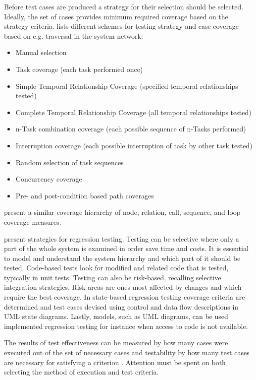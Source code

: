 \documentclass[12pt,a4paper,oneside,pdftex]{report}
\begin{document}
{Before test cases are produced a strategy for their selection should be selected. Ideally, the set of cases provides minimum required coverage based on the strategy criteria. \citet{benz2007combining} lists different schemes for testing strategy and case coverage based on e.g. traversal in the system network:
\begin{itemize}
\item Manual selection
\item Task coverage (each task performed once)
\item Simple Temporal Relationship Coverage (specified temporal relationships tested)
\item Complete Temporal Relationship Coverage (all temporal relationships tested)
\item n-Task combination coverage (each possible sequence of n-Tasks performed)
\item Interruption coverage (each possible interruption of task by other task tested)
\item Random selection of task sequences
\item Concurrency coverage
\item Pre- and post-condition based path coverages
\end{itemize}

\citet{linnenkugel1990test} present a similar coverage hierarchy of node, relation, call, sequence, and loop coverage measures. %

\citet{bhuyan2012survey} present strategies for regression testing. Testing can be selective where only a part of the whole system is examined in order save time and costs. It is essential to model and understand the system hierarchy and which part of it should be tested. Code-based tests look for modified and related code that is tested, typically in unit tests. Testing can also be risk-based, recalling selective integration strategies. Risk areas are ones most affected by changes and which require the best coverage. In state-based regression testing coverage criteria are determined and test cases devised using control and data flow descriptions in UML state diagrams. Lastly, models, such as UML diagrams, can be used implemented regression testing for instance when access to code is not available. \citep{bhuyan2012survey}

The results of test effectiveness can be measured by how many cases were executed out of the set of necessary cases and testability by how many test cases are necessary for satisfying a criterion \citep{linnenkugel1990test}. Attention must be spent on both selecting the method of execution and test criteria. 

}
\end{document}
